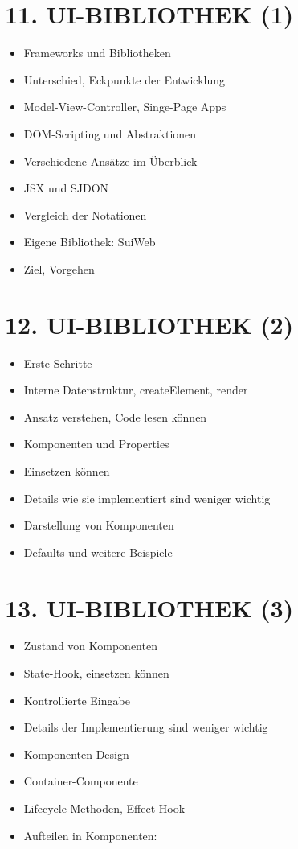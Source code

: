 \section*{11. UI-BIBLIOTHEK (1)}
\begin{itemize}
  \item Frameworks und Bibliotheken
  \item Unterschied, Eckpunkte der Entwicklung
  \item Model-View-Controller, Singe-Page Apps
  \item DOM-Scripting und Abstraktionen
  \item Verschiedene Ansätze im Überblick
  \item JSX und SJDON
  \item Vergleich der Notationen
  \item Eigene Bibliothek: SuiWeb
  \item Ziel, Vorgehen
\end{itemize}

\section*{12. UI-BIBLIOTHEK (2)}
\begin{itemize}
  \item Erste Schritte
  \item Interne Datenstruktur, createElement, render
  \item Ansatz verstehen, Code lesen können
  \item Komponenten und Properties
  \item Einsetzen können
  \item Details wie sie implementiert sind weniger wichtig
  \item Darstellung von Komponenten
  \item Defaults und weitere Beispiele
\end{itemize}

\section*{13. UI-BIBLIOTHEK (3)}
\begin{itemize}
  \item Zustand von Komponenten
  \item State-Hook, einsetzen können
  \item Kontrollierte Eingabe
  \item Details der Implementierung sind weniger wichtig
  \item Komponenten-Design
  \item Container-Componente
  \item Lifecycle-Methoden, Effect-Hook
  \item Aufteilen in Komponenten:
\end{itemize}

